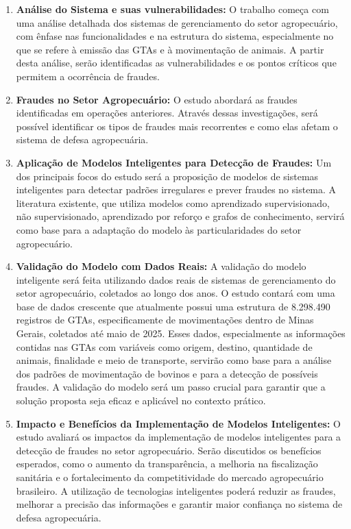 \begin{enumerate}
\item \textbf{Análise do Sistema e suas vulnerabilidades:} O trabalho começa com uma análise detalhada dos sistemas de gerenciamento do setor agropecuário, com ênfase nas funcionalidades e na estrutura do sistema, especialmente no que se refere à emissão das GTAs e à movimentação de animais. A partir desta análise, serão identificadas as vulnerabilidades e os pontos críticos que permitem a ocorrência de fraudes.

\item \textbf{Fraudes no Setor Agropecuário:} O estudo abordará as fraudes identificadas em operações anteriores. Através dessas investigações, será possível identificar os tipos de fraudes mais recorrentes e como elas afetam o sistema de defesa agropecuária.

\item \textbf{Aplicação de Modelos Inteligentes para Detecção de Fraudes:} Um dos principais focos do estudo será a proposição de modelos de sistemas inteligentes para detectar padrões irregulares e prever fraudes no sistema. A literatura existente, que utiliza modelos como aprendizado supervisionado, não supervisionado, aprendizado por reforço e grafos de conhecimento, servirá como base para a adaptação do modelo às particularidades do setor agropecuário.

\item \textbf{Validação do Modelo com Dados Reais:} A validação do modelo inteligente será feita utilizando dados reais de sistemas de gerenciamento do setor agropecuário, coletados ao longo dos anos. O estudo contará com uma base de dados crescente que atualmente possui uma estrutura de 8.298.490 registros de GTAs, especificamente de movimentações dentro de Minas Gerais, coletados até maio de 2025. Esses dados, especialmente as informações contidas nas GTAs com variáveis como origem, destino, quantidade de animais, finalidade e meio de transporte, servirão como base para a análise dos padrões de movimentação de bovinos e para a detecção de possíveis fraudes. A validação do modelo será um passo crucial para garantir que a solução proposta seja eficaz e aplicável no contexto prático.

\item \textbf{Impacto e Benefícios da Implementação de Modelos Inteligentes:} O estudo avaliará os impactos da implementação de modelos inteligentes para a detecção de fraudes no setor agropecuário. Serão discutidos os benefícios esperados, como o aumento da transparência, a melhoria na fiscalização sanitária e o fortalecimento da competitividade do mercado agropecuário brasileiro. A utilização de tecnologias inteligentes poderá reduzir as fraudes, melhorar a precisão das informações e garantir maior confiança no sistema de defesa agropecuária.


\end{enumerate}
